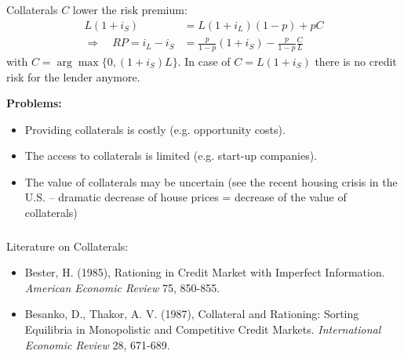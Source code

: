 \documentclass[11pt]{beamer}
\begin{document}
\begin{frame}
\frametitle{\insertsection}

Collaterals $C$ lower the risk premium:
\begin{align}
L(1+i_S) &=L(1+i_L)(1-p)+pC\\
\Rightarrow\quad
RP=i_L-i_S &=\frac{p}{1-p}(1+i_S)-\frac{p}{1-p}\frac{C}{L}
\end{align}
with $C=\arg\max\{0,(1+i_S)L\}$. In case of $C=L(1+i_S)$ there is no credit risk for the lender anymore.
\par\medskip

\textbf{Problems:}
\begin{itemize}
\item Providing collaterals is costly (e.g. opportunity costs).
\item The access to collaterals is limited (e.g. start-up companies).
\item The value of collaterals may be uncertain (see the recent housing crisis in the U.S. -- dramatic decrease of house prices = decrease of the value of collaterals)
\end{itemize}
\end{frame}


\begin{frame}
\frametitle{\insertsection}

Literature on Collaterals:
\par\bigskip

\begin{itemize}
\item Bester, H. (1985), Rationing in Credit Market with Imperfect Information. \textit{American Economic Review} 75, 850-855.

\item Besanko, D., Thakor, A. V. (1987), Collateral and Rationing: Sorting Equilibria
in Monopolistic and Competitive Credit Markets. \textit{International Economic Review} 28, 671-689.
\end{itemize}
\end{frame}



%
\end{document}
